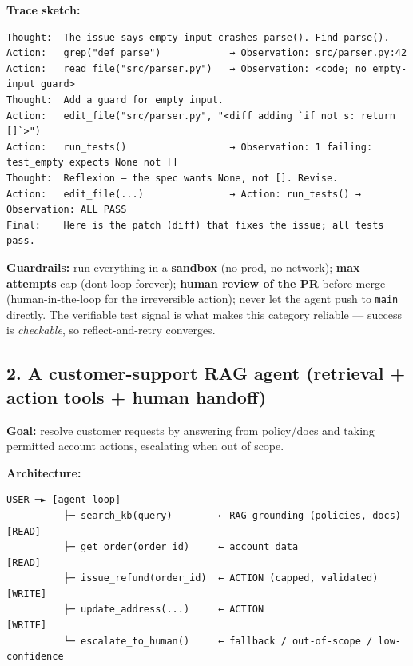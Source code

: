 \documentclass[11pt]{article}
\begin{document}
\textbf{Trace sketch:}

\setcodelang{}

\begin{verbatim}
Thought:  The issue says empty input crashes parse(). Find parse().
Action:   grep("def parse")            → Observation: src/parser.py:42
Action:   read_file("src/parser.py")   → Observation: <code; no empty-input guard>
Thought:  Add a guard for empty input.
Action:   edit_file("src/parser.py", "<diff adding `if not s: return []`>")
Action:   run_tests()                  → Observation: 1 failing: test_empty expects None not []
Thought:  Reflexion — the spec wants None, not []. Revise.
Action:   edit_file(...)               → Action: run_tests() → Observation: ALL PASS
Final:    Here is the patch (diff) that fixes the issue; all tests pass.
\end{verbatim}

\textbf{Guardrails:} run everything in a \textbf{sandbox} (no prod, no network); \textbf{max attempts} cap (don\textquotesingle t loop forever); \textbf{human review of the PR} before merge (human-in-the-loop for the irreversible action); never let the agent push to \texttt{main} directly. The verifiable test signal is what makes this category reliable --- success is \emph{checkable}, so reflect-and-retry converges.

\subsection{2. A customer-support RAG agent (retrieval + action tools + human handoff)}\label{2-a-customer-support-rag-agent-retrieval--action-tools--human-handoff}

\textbf{Goal:} resolve customer requests by answering from policy/docs and taking permitted account actions, escalating when out of scope.

\textbf{Architecture:}

\setcodelang{}

\begin{verbatim}
USER ─► [agent loop]
          ├─ search_kb(query)        ← RAG grounding (policies, docs)  [READ]
          ├─ get_order(order_id)     ← account data                    [READ]
          ├─ issue_refund(order_id)  ← ACTION (capped, validated)      [WRITE]
          ├─ update_address(...)     ← ACTION                          [WRITE]
          └─ escalate_to_human()     ← fallback / out-of-scope / low-confidence
\end{verbatim}
\end{document}
